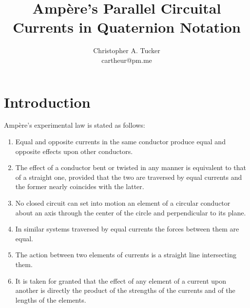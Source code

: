 \documentclass[]{article}
\begin{document}
\title{Amp\`ere's Parallel Circuital Currents in Quaternion Notation}

\author{Christopher A. Tucker\\cartheur@pm.me\\}


\maketitle


\section{Introduction}
Amp\`ere's experimental law is stated as follows:

\begin{enumerate}
  \item Equal and opposite currents in the same conductor produce equal and opposite effects upon other conductors.
  \item The effect of a conductor bent or twisted in any manner is equivalent to that of a straight one, provided that the two are traversed by equal currents and the former nearly coincides with the latter.
  \item No closed circuit can set into motion an element of a circular conductor about an axis through the center of the circle and perpendicular to its plane.
  \item In similar systems traversed by equal currents the forces between them are equal.
  \item The action between two elements of currents is a straight line intersecting them.
  \item It is taken for granted that the effect of any element of a current upon another is directly the product of the strengths of the currents and of the lengths of the elements.
\end{enumerate}
\end{document}
